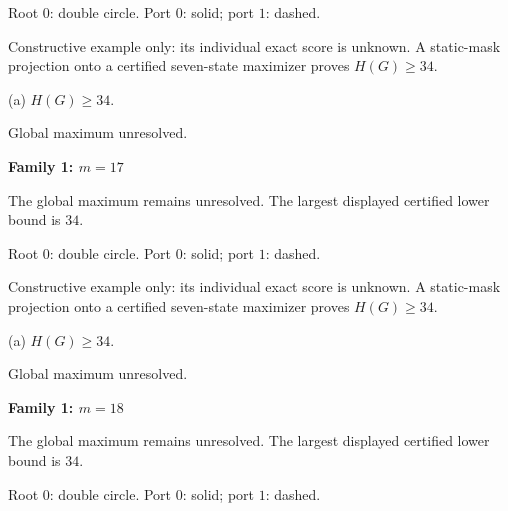\documentclass[10pt,a4paper]{article}
\begin{document}
\vspace{1mm}
{\small Root $0$: double circle. Port $0$: solid; port $1$: dashed.}\par
\vspace{3mm}
{\small Constructive example only: its individual exact score is unknown. A static-mask projection onto a certified seven-state maximizer proves $H(G)\ge34$.}\par\vspace{2mm}
\noindent\hfill
\begin{minipage}[t]{.96\textwidth}\centering
\resizebox{14cm}{!}{}\par
{\footnotesize (a) $H(G)\ge 34$.\par Global maximum unresolved.}\par
\end{minipage}\hfill
\par\vspace{2.5mm}
\clearpage
{\Large\bfseries Family 1: $m=17$}\par
\vspace{2mm}
{\small The global maximum remains unresolved. The largest displayed certified lower bound is $34$.}\par
\vspace{1mm}
{\small Root $0$: double circle. Port $0$: solid; port $1$: dashed.}\par
\vspace{3mm}
{\small Constructive example only: its individual exact score is unknown. A static-mask projection onto a certified seven-state maximizer proves $H(G)\ge34$.}\par\vspace{2mm}
\noindent\hfill
\begin{minipage}[t]{.96\textwidth}\centering
\resizebox{14cm}{!}{}\par
{\footnotesize (a) $H(G)\ge 34$.\par Global maximum unresolved.}\par
\end{minipage}\hfill
\par\vspace{2.5mm}
\clearpage
{\Large\bfseries Family 1: $m=18$}\par
\vspace{2mm}
{\small The global maximum remains unresolved. The largest displayed certified lower bound is $34$.}\par
\vspace{1mm}
{\small Root $0$: double circle. Port $0$: solid; port $1$: dashed.}\par
\end{document}
